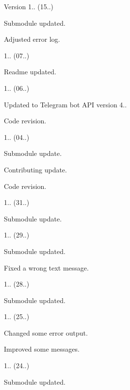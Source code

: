 \begin{DoxyVersion}{Version}
1.. (15..)
\begin{DoxyItemize}
\item Submodule updated.
\item Adjusted error log. 
\end{DoxyItemize}

1.. (07..)
\begin{DoxyItemize}
\item Readme updated. 
\end{DoxyItemize}

1.. (06..)
\begin{DoxyItemize}
\item Updated to Telegram bot A\+PI version 4..
\item Code revision. 
\end{DoxyItemize}

1.. (04..)
\begin{DoxyItemize}
\item Submodule update.
\item Contributing update.
\item Code revision. 
\end{DoxyItemize}

1.. (31..)
\begin{DoxyItemize}
\item Submodule update. 
\end{DoxyItemize}

1.. (29..)
\begin{DoxyItemize}
\item Submodule updated.
\item Fixed a wrong text message. 
\end{DoxyItemize}

1.. (28..)
\begin{DoxyItemize}
\item Submodule updated. 
\end{DoxyItemize}

1.. (25..)
\begin{DoxyItemize}
\item Changed some error output.
\item Improved some messages. 
\end{DoxyItemize}

1.. (24..)
\begin{DoxyItemize}
\item Submodule updated. 
\end{DoxyItemize}


\end{DoxyVersion}
